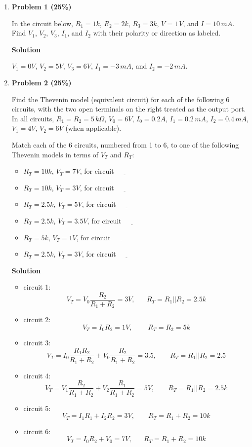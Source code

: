 \documentclass[12pt]{article}
\begin{document}
\begin{enumerate}

\item {\bf Problem 1 (25\%)} 

In the circuit below, $R_1=1k$, $R_2=2k$, $R_3=3k$, $V=1\,V$, and $I=10\,mA$.
Find $V_1$, $V_2$, $V_3$, $I_1$, and $I_2$ with their polarity or direction
as labeled.


{\bf Solution}

$V_1=0V$, $V_2=5V$, $V_3=6V$, $I_1=-3\,mA$, and $I_2=-2\,mA$.


\item {\bf Problem 2 (25\%)} 

Find the Thevenin model (equivalent circuit) for each of the following 6
circuits, with the two open terminals on the right treated as the output
port. In all circuits, $R_1=R_2=5\,k\Omega$, $V_0=6V$, $I_0=0.2A$, $I_1=0.2\,mA$,
$I_2=0.4\,mA$, $V_1=4V$, $V_2=6V$ (when applicable).

Match each of the 6 circuits, numbered from 1 to 6, to one of the following
Thevenin models in terms of $V_T$ and $R_T$:
\begin{itemize}
\item $R_T=10k$, $V_T=7V$, for circuit $\underline{\hspace{1cm}}$
\item $R_T=10k$, $V_T=3V$, for circuit $\underline{\hspace{1cm}}$
\item $R_T=2.5k$, $V_T=5V$, for circuit $\underline{\hspace{1cm}}$
\item $R_T=2.5k$, $V_T=3.5V$, for circuit $\underline{\hspace{1cm}}$
\item $R_T=5k$, $V_T=1V$, for circuit $\underline{\hspace{1cm}}$
\item $R_T=2.5k$, $V_T=3V$, for circuit $\underline{\hspace{1cm}}$
\end{itemize}


{\bf Solution}
\begin{itemize}
\item circuit 1:
  \[
  V_T=V_0\frac{R_2}{R_1+R_2}=3V,\;\;\;\;\;\;R_T=R_1||R_2=2.5k 
  \]
\item circuit 2:
  \[
  V_T=I_0R_2=1V,\;\;\;\;\;\;\;\;R_T=R_2=5k
  \]
\item circuit 3:
  \[
  V_T=I_0\frac{R_1R_2}{R_1+R_2}+V_0\frac{R_2}{R_1+R_2}=3.5,\;\;\;\;\;\;\;
  R_T=R_1||R_2=2.5
  \]
\item circuit 4:
  \[
  V_T=V_1\frac{R_2}{R_1+R_2}+V_2\frac{R_1}{R_1+R_2}=5V,\;\;\;\;\;\;\;
  R_T=R_1||R_2=2.5k
  \]
\item circuit 5:
  \[
  V_T=I_1R_1+I_2R_2=3V,\;\;\;\;\;\;\;R_T=R_1+R_2=10k
  \]
\item circuit 6:
  \[
  V_T=I_0R_2+V_0=7V,\;\;\;\;\;\;R_T=R_1+R_2=10k
  \]
\end{itemize}


\end{enumerate}
\end{document}
